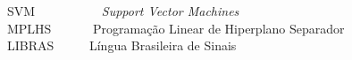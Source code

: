 
SVM \ \ \ \ \ \ \ \ \ \ \textit{Support Vector Machines} \\
MPLHS \ \ \ \ \ \ Programação Linear de Hiperplano Separador \\
LIBRAS \ \ \ \ \ Língua Brasileira de Sinais
